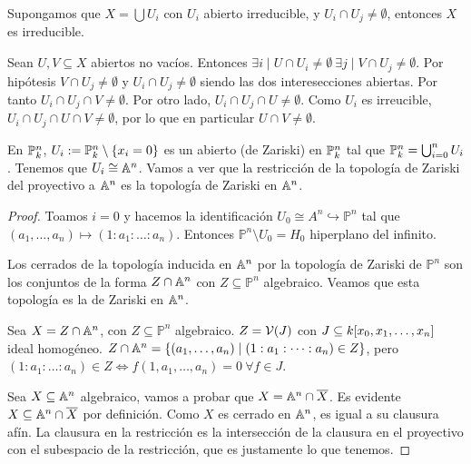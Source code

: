 \documentclass[ACGA.tex]{subfiles}
\begin{document}
\begin{prop}
Supongamos que $X=\bigcup U_i$ con $U_i$ abierto irreducible, y $U_i\cap U_j\neq\emptyset$, entonces $X$ es irreducible.
\end{prop}
\begin{dem}
Sean $U,V\subseteq X$ abiertos no vacíos. Entonces $\exists i\mid U\cap U_i\neq\emptyset\ \exists j\mid V\cap U_j\neq\emptyset$. Por hipótesis $V\cap U_j\neq\emptyset$ y $U_i\cap U_j\neq\emptyset$ siendo las dos interesecciones abiertas. Por tanto $U_i\cap U_j\cap V\neq\emptyset$. Por otro lado, $U_i\cap U_j\cap U\neq\emptyset$. Como $U_i$ es irreucible, $U_i\cap U_j\cap U\cap V\neq\emptyset$, por lo que en particular $U\cap V\neq\emptyset$.  \QED
\end{dem}
En $\mathbb{P}^n_k$, $U_i:=\mathbb{P}^n_k\setminus\{x_i=0\}$ es un abierto (de Zariski) en $\mathbb{P}^n_k$ tal que $\mathbb{P}^n_k=\bigcup_{i=0}^n U_i$. Tenemos que $U_i\cong\mathbb{A}^n$. Vamos a ver que la restricción de la topología de Zariski del proyectivo a $\mathbb{A}^n$ es la topología de Zariski en $\mathbb{A}^n$. 
\begin{proof}
Toamos $i=0$ y hacemos la identificación $U_0\cong A^n\hookrightarrow\mathbb{P}^n$ tal que $(a_1,\dots,a_n)\mapsto(1:a_1:\dots :a_n)$. Entonces $\mathbb{P}^n\setminus U_0=H_0$ hiperplano del infinito. 

Los cerrados de la topología inducida en $\mathbb{A}^n$ por la topología de Zariski de $\mathbb{P}^n$ son los conjuntos de la forma $Z\cap\mathbb{A}^n$ con $Z\subseteq\mathbb{P}^n$ algebraico. Veamos que esta topología es la de Zariski en $\mathbb{A}^n$.

Sea $X=Z\cap\mathbb{A}^n$, con $Z\subseteq\mathbb{P}^n$ algebraico. $Z=\mathcal{V}(J)$ con $J\subseteq k[x_0,x_1,\dotsc,x_{n}]$ ideal homogéneo. $Z\cap\mathbb{A}^n=\{(a_1,\dots,a_n)\mid (1:a_1:\dots:a_n)\in Z\}$, pero $(1:a_1:\dots:a_n)\in Z\Leftrightarrow f(1,a_1,\dots,a_n)=0\ \forall f\in J$. 

Sea $X\subseteq\mathbb{A}^n$ algebraico, vamos a probar que $X=\mathbb{A}^n\cap\overline{X}$. Es evidente $X\subseteq\mathbb{A}^n\cap\overline{X}$ por definición. Como $X$ es cerrado en $\mathbb{A}^n$, es igual a su clausura afín. La clausura en la restricción es la intersección de la clausura en el proyectivo con el subespacio de la restricción, que es justamente lo que tenemos. 


\end{proof}
\end{document}
